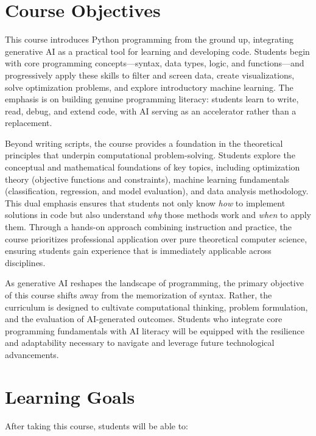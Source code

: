\documentclass[11pt]{article}
\begin{document}
\section{Course Objectives}

This course introduces Python programming from the ground up, integrating generative AI as a
practical tool for learning and developing code. Students begin with core programming
concepts---syntax, data types, logic, and functions---and progressively apply these skills to
filter and screen data, create visualizations, solve optimization problems, and explore
introductory machine learning. The emphasis is on building genuine programming literacy:
students learn to write, read, debug, and extend code, with AI serving as an accelerator
rather than a replacement.

Beyond writing scripts, the course provides a foundation in the theoretical principles that
underpin computational problem-solving. Students explore the conceptual and mathematical
foundations of key topics, including optimization theory (objective functions and
constraints), machine learning fundamentals (classification, regression, and model
evaluation), and data analysis methodology. This dual emphasis ensures that students not only
know \emph{how} to implement solutions in code but also understand \emph{why} those methods
work and \emph{when} to apply them. Through a hands-on approach combining instruction and
practice, the course prioritizes professional application over pure theoretical computer
science, ensuring students gain experience that is immediately applicable across disciplines.

As generative AI reshapes the landscape of programming, the primary objective of this course
shifts away from the memorization of syntax. Rather, the curriculum is designed to cultivate
computational thinking, problem formulation, and the evaluation of AI-generated outcomes.
Students who integrate core programming fundamentals with AI literacy will be equipped with
the resilience and adaptability necessary to navigate and leverage future technological
advancements.

\section{Learning Goals}

After taking this course, students will be able to:
\end{document}
